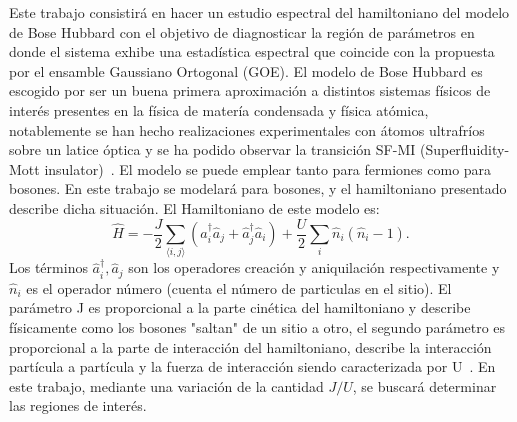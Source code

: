 \documentclass[spanish,titlepage,table]{practicas}
\begin{document}
Este trabajo consistirá en hacer un estudio espectral del hamiltoniano del modelo de Bose Hubbard 
con el objetivo de diagnosticar la región de parámetros en donde el sistema exhibe una estadística espectral 
que coincide con la propuesta por el ensamble Gaussiano Ortogonal (GOE). El modelo de Bose Hubbard es escogido por ser un buena primera aproximación a distintos sistemas físicos de interés presentes en la física de matería condensada y física atómica, notablemente 
se han hecho realizaciones experimentales con átomos ultrafríos sobre un latice óptica y se ha podido observar la transición SF-MI (Superfluidity-Mott insulator)~\cite{Zhang2010}. 
El modelo se puede emplear tanto para fermiones como para bosones. En este trabajo se modelará para bosones, y el hamiltoniano presentado describe dicha situación. El Hamiltoniano de este modelo es:
\begin{equation}
\hat{H}
= -\frac{J}{2} \sum_{\langle i,j\rangle} \!\left(\hat{a}_i^{\dagger}\hat{a}_j + \hat{a}_j^{\dagger}\hat{a}_i\right)
+ \frac{U}{2}\sum_{i}\hat{n}_i(\hat{n}_i - 1).
\end{equation}
Los términos $\hat{a}_i^{\dagger},\hat{a}_j$ son los operadores creación y aniquilación respectivamente y $\hat{n}_i$ es el operador número (cuenta el número de particulas en el sitio).
El parámetro J es proporcional a la parte cinética del hamiltoniano y describe físicamente como los bosones "saltan" de un sitio a otro, el segundo parámetro es proporcional a la parte de interacción del hamiltoniano, describe 
la interacción partícula a partícula y la fuerza de interacción siendo caracterizada por U~\cite{Zhang2010}. 
En este trabajo, mediante una variación de la cantidad $J/U$, se buscará determinar las regiones de interés.
\end{document}

